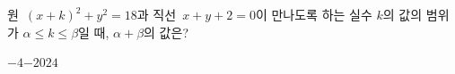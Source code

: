 원~$(x+k)^2+y^2=18$과 직선~$x+y+2=0$이 만나도록 하는 실수 $k$의 값의 범위가 $\alpha\le k\le\beta$일 때, $\alpha+\beta$의 값은?
\begin{choices32}{$-4$}{$-2$}{$0$}{$2$}{$4$}\end{choices32}

